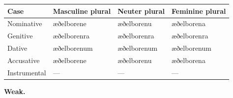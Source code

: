 \fontsize{10.5}{13.2}\selectfont
\par\begin{minipage}{\linewidth}\raggedright
\setlength{\LTleft}{0pt}\setlength{\LTright}{\fill}
\noindent
\begin{tabular}{@{}>{\raggedright\arraybackslash}p{22mm}>{\raggedright\arraybackslash}p{31.18mm}>{\raggedright\arraybackslash}p{31.18mm}>{\raggedright\arraybackslash}p{31.18mm}@{}}
\toprule
\textbf{Case} & \textbf{Masculine plural} & \textbf{Neuter plural} & \textbf{Feminine plural} \\
\midrule
Nominative & æðelborene & æðelborenu & æðelborena \\
Genitive & æðelborenra & æðelborenra & æðelborenra \\
Dative & æðelborenum & æðelborenum & æðelborenum \\
Accusative & æðelborene & æðelborenu & æðelborena \\
Instrumental & — & — & — \\
\bottomrule
\end{tabular}
\end{minipage}\par
\par\endgroup
\par\addvspace{5pt}

\textbf{Weak.}

